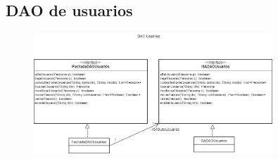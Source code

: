 \documentclass[12pt]{article}
\begin{document}
\subsection{DAO de usuarios}
\begin{figure}[H]
    \centering
    \includegraphics[width=0.8\textwidth]{images/DAOUsuarios.png}
\end{figure}
\end{document}
